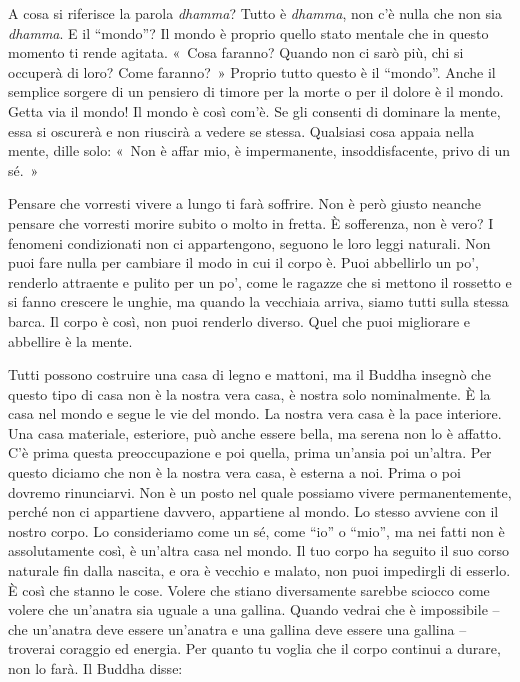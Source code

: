 A cosa si riferisce la parola \emph{dhamma}? Tutto è \emph{dhamma}, non
c'è nulla che non sia \emph{dhamma}. E il ``mondo''? Il mondo è proprio
quello stato mentale che in questo momento ti rende agitata. «~Cosa
faranno? Quando non ci sarò più, chi si occuperà di loro? Come
faranno?~» Proprio tutto questo è il ``mondo''. Anche il semplice
sorgere di un pensiero di timore per la morte o per il dolore è il
mondo. Getta via il mondo! Il mondo è così com'è. Se gli consenti di
dominare la mente, essa si oscurerà e non riuscirà a vedere se stessa.
Qualsiasi cosa appaia nella mente, dille solo: «~Non è affar mio, è
impermanente, insoddisfacente, privo di un sé.~»

Pensare che vorresti vivere a lungo ti farà soffrire. Non è però giusto
neanche pensare che vorresti morire subito o molto in fretta. È
sofferenza, non è vero? I fenomeni condizionati non ci appartengono,
seguono le loro leggi naturali. Non puoi fare nulla per cambiare il modo
in cui il corpo è. Puoi abbellirlo un po', renderlo attraente e pulito
per un po', come le ragazze che si mettono il rossetto e si fanno
crescere le unghie, ma quando la vecchiaia arriva, siamo tutti sulla
stessa barca. Il corpo è così, non puoi renderlo diverso. Quel che puoi
migliorare e abbellire è la mente.

Tutti possono costruire una casa di legno e mattoni, ma il Buddha
insegnò che questo tipo di casa non è la nostra vera casa, è nostra solo
nominalmente. È la casa nel mondo e segue le vie del mondo. La nostra
vera casa è la pace interiore. Una casa materiale, esteriore, può anche
essere bella, ma serena non lo è affatto. C'è prima questa
preoccupazione e poi quella, prima un'ansia poi un'altra. Per questo
diciamo che non è la nostra vera casa, è esterna a noi. Prima o poi
dovremo rinunciarvi. Non è un posto nel quale possiamo vivere
permanentemente, perché non ci appartiene davvero, appartiene al mondo.
Lo stesso avviene con il nostro corpo. Lo consideriamo come un sé, come
``io'' o ``mio'', ma nei fatti non è assolutamente così, è un'altra casa
nel mondo. Il tuo corpo ha seguito il suo corso naturale fin dalla
nascita, e ora è vecchio e malato, non puoi impedirgli di esserlo. È
così che stanno le cose. Volere che stiano diversamente sarebbe sciocco
come volere che un'anatra sia uguale a una gallina. Quando vedrai che è
impossibile -- che un'anatra deve essere un'anatra e una gallina deve
essere una gallina -- troverai coraggio ed energia. Per quanto tu voglia
che il corpo continui a durare, non lo farà. Il Buddha disse:

